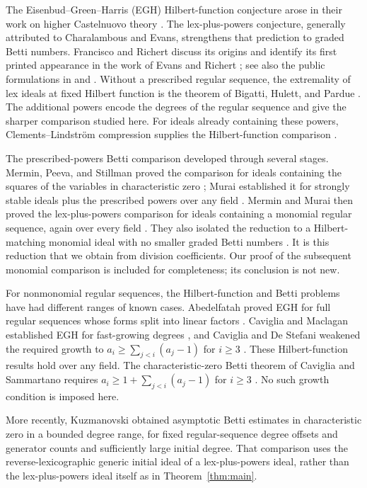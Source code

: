 The Eisenbud--Green--Harris (EGH) Hilbert-function conjecture arose in
their work on higher Castelnuovo theory \cite[Section~4]{EGH}.
The lex-plus-powers conjecture, generally attributed to Charalambous
and Evans, strengthens that prediction to graded Betti numbers.
Francisco and Richert discuss its origins and identify its first
printed appearance in the work of Evans and Richert
\cite[Section~5]{FR}; see also the public formulations in
\cite[Section~1]{Richert} and
\cite[Conjectures~1.1 and 1.2]{CS}.
Without a prescribed regular sequence, the extremality of lex ideals
at fixed Hilbert function is the theorem of Bigatti, Hulett, and
Pardue \cite{Bigatti,Hulett,Pardue}.
The additional powers encode the degrees of the regular sequence and
give the sharper comparison studied here.
For ideals already containing these powers, Clements--Lindstr\"om
compression supplies the Hilbert-function comparison \cite{CL}.

The prescribed-powers Betti comparison developed through several stages.
Mermin, Peeva, and Stillman proved the comparison for ideals containing
the squares of the variables in characteristic zero
\cite[Theorem~1.1]{MPS}; Murai established it for strongly stable ideals
plus the prescribed powers over any field \cite[Theorem~1.1]{Murai}.
Mermin and Murai then proved the lex-plus-powers comparison for ideals
containing a monomial regular sequence, again over every field
\cite[Theorems~3.1 and 8.1]{MM}. They also isolated the reduction to a
Hilbert-matching monomial ideal with no smaller graded Betti numbers
\cite[Conjecture~10.2]{MM}. It is this reduction that we obtain from
division coefficients. Our proof of the subsequent monomial comparison
is included for completeness; its conclusion is not new.

For nonmonomial regular sequences, the Hilbert-function and Betti problems
have had different ranges of known cases. Abedelfatah proved EGH for full
regular sequences whose forms split into linear factors
\cite[Corollary~4.3]{Abedelfatah15}. Caviglia and Maclagan established
EGH for fast-growing degrees \cite{CM08}, and Caviglia and De Stefani
weakened the required growth to
\(a_i\ge\sum_{j<i}(a_j-1)\) for \(i\ge3\)
\cite[Theorem~A]{CDeS20}. These Hilbert-function results hold over any
field. The characteristic-zero Betti theorem of Caviglia and Sammartano
requires
\(a_i\ge1+\sum_{j<i}(a_j-1)\) for \(i\ge3\)
\cite[Theorem~3.8]{CS}. No such growth condition is imposed here.

More recently, Kuzmanovski \cite[Theorem~1.9]{Kuzmanovski} obtained
asymptotic Betti estimates in characteristic zero in a bounded degree range,
for fixed regular-sequence degree offsets and generator counts and
sufficiently large initial degree. That comparison uses the
reverse-lexicographic generic initial ideal of a lex-plus-powers ideal,
rather than the lex-plus-powers ideal itself as in Theorem~\ref{thm:main}.

